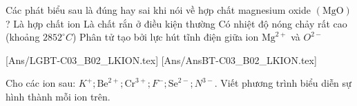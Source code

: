 \begin{ex}
	Các phát biểu sau là đúng hay sai khi nói về hợp chất magnesium oxide $(\mathrm{MgO})$?
	\choiceTF
	{\True Là hợp chất ion}
	{\True Là chất rắn ở điều kiện thường}
	{\True Có nhiệt độ nóng chảy rất cao (khoảng $2852^{\circ} C$)}
	{\True Phân tử tạo bởi lực hút tĩnh điện giữa ion $\mathrm{Mg}^{2+}$ và $O^{2-}$}
	\loigiai{}
\end{ex}
[Ans/LGBT-C03_B02_LKION.tex]
[Ans/AnsBT-C03_B02_LKION.tex]
\begin{bt}
	Cho các ion sau: $K^{+}; \mathrm{Be}^{2+}; \mathrm{Cr}^{3+}; F^{-}; \mathrm{Se}^{2-}; N^{3-}$.
	Viết phương trình biểu diễn sự hình thành mỗi ion trên.
\end{bt}

